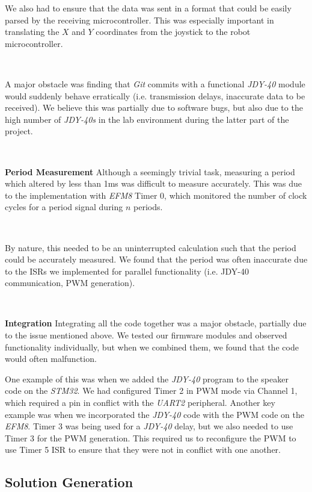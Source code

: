 \documentclass{article}
\begin{document}
We also had to ensure that the data was sent in a format that could be easily parsed by the receiving microcontroller. This was especially important in translating the
$X$ and $Y$ coordinates from the joystick to the robot microcontroller.

\

A major obstacle was finding that \textit{Git} commits with a functional \textit{JDY-40} module would suddenly behave erratically
(i.e. transmission delays, inaccurate data to be received). We believe this was partially due to software bugs, but also due to the high number of \textit{JDY-40s}
in the lab environment during the latter part of the project.

\

\textbf{Period Measurement}
Although a seemingly trivial task, measuring a period which altered by less than
1ms was difficult to measure accurately. This was due to the implementation with \textit{EFM8} Timer 0,
which monitored the number of clock cycles for a period signal during $n$ periods.

\

By nature, this needed to be an uninterrupted calculation such that the period could be accurately measured. We found that the period was often inaccurate due to the ISRs we implemented for
parallel functionality (i.e. JDY-40 communication, PWM generation).

\

\textbf{Integration}
Integrating all the code together was a major obstacle, partially due to the issue mentioned above. We tested our firmware modules and observed functionality
individually, but when we combined them, we found that the code would often malfunction.

One example of this was when we added the \textit{JDY-40} program to the speaker code on the \textit{STM32}. We had configured Timer 2 in PWM mode via Channel 1, which
required a pin in conflict with the \textit{UART2} peripheral. Another key example was when we incorporated the \textit{JDY-40} code with the PWM code
on the \textit{EFM8}. Timer 3 was being used for a \textit{JDY-40} delay, but we also needed to use Timer 3 for the PWM generation. This required us to
reconfigure the PWM to use Timer 5 ISR to ensure that they were not in conflict with one another.

\subsection{Solution Generation}
\end{document}
